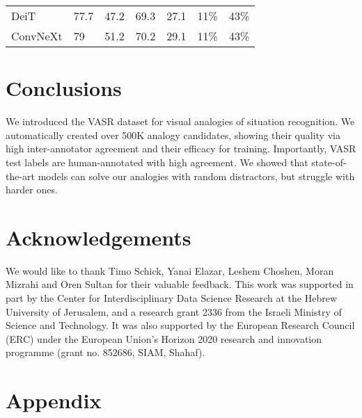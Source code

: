 \documentclass[letterpaper]{article} \usepackage{aaai23}  \usepackage{times}  \usepackage{helvet}  \usepackage{courier}  \usepackage[hyphens]{url}  \usepackage{graphicx} \urlstyle{rm} \def\UrlFont{\rm}  \usepackage{natbib}  \usepackage{caption} \frenchspacing  \setlength{\pdfpagewidth}{8.5in}  \setlength{\pdfpageheight}{11in}  \usepackage{algorithm}
\begin{document}
\begin{table}[!tb]
{\begin{tabular}{@{}lllllll@{}}
DeiT     & 77.7                                                              & 47.2                                                                 & 69.3                                                              & 27.1                                                                 & 11\%                                                              & 43\%                                                                 \\
ConvNeXt & 79                                                                & 51.2                                                                 & 70.2                                                              & 29.1                                                                 & 11\%                                                              & 43\%                                                                 \\ \bottomrule
\end{tabular}}
\end{table}

\section{Conclusions}
We introduced the VASR dataset for visual analogies of situation recognition. 
We automatically created over 500K analogy candidates, showing their quality via high inter-annotator agreement and their efficacy for training.
Importantly, VASR test labels are human-annotated with high agreement. We showed that state-of-the-art models can solve our analogies with random distractors, but struggle with harder ones.


\section*{Acknowledgements}
We would like to thank Timo Schick, Yanai Elazar, Leshem Choshen, Moran Mizrahi and Oren Sultan for their valuable feedback. This work was supported in part by the Center for Interdisciplinary Data Science Research at the Hebrew University of Jerusalem, and a research grant 2336 from the Israeli Ministry of Science and Technology. It was also supported by the European Research Council (ERC) under the European Union’s Horizon 2020 research and innovation programme (grant no. 852686, SIAM, Shahaf).



\section{Appendix}
\label{sec:appendix}
\end{document}
